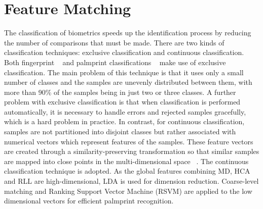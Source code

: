 \section{Feature Matching}
\label{sec:methodology:featurematch}

The classification of biometrics speeds up the identification process by reducing the number of comparisons that must be made. There are two kinds of classification techniques: exclusive classification and continuous classification. Both fingerprint ~\cite{[14]} and palmprint classifications ~\cite{[15]} make use of exclusive classification. The main problem of this technique is that it uses only a small number of classes and the samples are unevenly distributed between them, with more than 90\% of the samples being in just two or three classes. A further problem with exclusive classification is that when classification is performed automatically, it is necessary to handle errors and rejected samples gracefully, which is a hard problem in practice. In contrast, for continuous classification, samples are not partitioned into disjoint classes but rather associated with numerical vectors which represent features of the samples. These feature vectors are created through a similarity-preserving transformation so that similar samples are mapped into close points in the multi-dimensional space ~\cite{[19]}. The continuous classification technique is adopted. As the global features combining MD, HCA and RLL are high-dimensional, LDA is used for dimension reduction. Coarse-level matching and Ranking Support Vector Machine (RSVM) are applied to the low dimensional vectors for efficient palmprint recognition.




